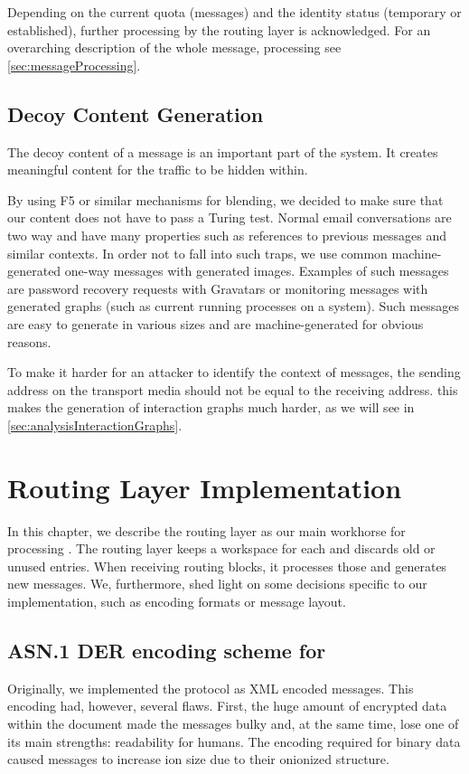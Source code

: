 Depending on the current quota (messages) and the identity status (temporary or established), further processing by the routing layer is acknowledged. For an overarching description of the whole message, processing see \cref{sec:messageProcessing}.


\section{Decoy Content Generation}
The decoy content of a message is an important part of the \MessageVortex{} system. It creates meaningful content for the traffic to be hidden within.

By using F5 or similar mechanisms for blending, we decided to make sure that our content does not have to pass a Turing test. Normal email conversations are two way and have many properties such as references to previous messages and similar contexts. In order not to fall into such traps, we use common machine-generated one-way messages with generated images. Examples of such messages are password recovery requests with Gravatars or monitoring messages with generated graphs (such as current running processes on a system). Such messages are easy to generate in various sizes and are machine-generated for obvious reasons.

To make it harder for an attacker to identify the context of messages, the sending address on the transport media should not be equal to the receiving address. this makes the generation of interaction graphs much harder, as we will see in \cref{sec:analysisInteractionGraphs}.

\chapter{Routing Layer Implementation}\label{sec:routingImplementation}
In this chapter, we describe the routing layer as our main workhorse for processing \VortexMessages. The routing layer keeps a workspace for each  and discards old or unused entries. When receiving routing blocks, it processes those and generates new messages. We, furthermore, shed light on some decisions specific to our implementation, such as encoding formats or message layout.

\section{ASN.1 DER encoding scheme for \VortexMessages}
Originally, we implemented the protocol as XML encoded messages. This encoding had, however, several flaws. First, the huge amount of encrypted data within the document made the messages bulky and, at the same time, lose one of its main strengths: readability for humans. The encoding required for binary data caused messages to increase ion size due to their onionized structure. 

